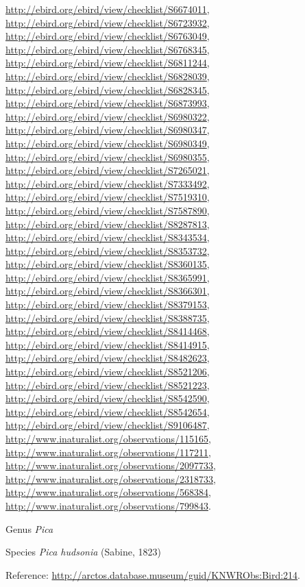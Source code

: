 \documentclass[9pt, article]{memoir}
\begin{document}
\begin{multicols}{2}
\url{http://ebird.org/ebird/view/checklist/S6674011}, 
\url{http://ebird.org/ebird/view/checklist/S6723932}, 
\url{http://ebird.org/ebird/view/checklist/S6763049}, 
\url{http://ebird.org/ebird/view/checklist/S6768345}, 
\url{http://ebird.org/ebird/view/checklist/S6811244}, 
\url{http://ebird.org/ebird/view/checklist/S6828039}, 
\url{http://ebird.org/ebird/view/checklist/S6828345}, 
\url{http://ebird.org/ebird/view/checklist/S6873993}, 
\url{http://ebird.org/ebird/view/checklist/S6980322}, 
\url{http://ebird.org/ebird/view/checklist/S6980347}, 
\url{http://ebird.org/ebird/view/checklist/S6980349}, 
\url{http://ebird.org/ebird/view/checklist/S6980355}, 
\url{http://ebird.org/ebird/view/checklist/S7265021}, 
\url{http://ebird.org/ebird/view/checklist/S7333492}, 
\url{http://ebird.org/ebird/view/checklist/S7519310}, 
\url{http://ebird.org/ebird/view/checklist/S7587890}, 
\url{http://ebird.org/ebird/view/checklist/S8287813}, 
\url{http://ebird.org/ebird/view/checklist/S8343534}, 
\url{http://ebird.org/ebird/view/checklist/S8353732}, 
\url{http://ebird.org/ebird/view/checklist/S8360135}, 
\url{http://ebird.org/ebird/view/checklist/S8365991}, 
\url{http://ebird.org/ebird/view/checklist/S8366301}, 
\url{http://ebird.org/ebird/view/checklist/S8379153}, 
\url{http://ebird.org/ebird/view/checklist/S8388735}, 
\url{http://ebird.org/ebird/view/checklist/S8414468}, 
\url{http://ebird.org/ebird/view/checklist/S8414915}, 
\url{http://ebird.org/ebird/view/checklist/S8482623}, 
\url{http://ebird.org/ebird/view/checklist/S8521206}, 
\url{http://ebird.org/ebird/view/checklist/S8521223}, 
\url{http://ebird.org/ebird/view/checklist/S8542590}, 
\url{http://ebird.org/ebird/view/checklist/S8542654}, 
\url{http://ebird.org/ebird/view/checklist/S9106487}, 
\url{http://www.inaturalist.org/observations/115165}, 
\url{http://www.inaturalist.org/observations/117211}, 
\url{http://www.inaturalist.org/observations/2097733}, 
\url{http://www.inaturalist.org/observations/2318733}, 
\url{http://www.inaturalist.org/observations/568384}, 
\url{http://www.inaturalist.org/observations/799843}.

\vspace{6pt}\noindent\hspace{30pt}Genus \textit{Pica}


\vspace{6pt}\noindent\hspace{36pt}Species \textit{Pica hudsonia} (Sabine, 1823)


\vspace{6pt}Reference: 
\url{http://arctos.database.museum/guid/KNWRObs:Bird:214}.


\end{multicols}
\end{document}
